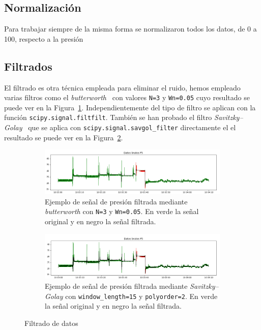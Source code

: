 \documentclass[a4paper,12pt,twoside,oldfontcommands]{memoir}
\begin{document}
\subsection{Normalización}
Para trabajar siempre de la misma forma se normalizaron todos los datos, de 0 a 100, respecto a la presión
\subsection{Filtrados}
El filtrado es otra técnica empleada para eliminar el ruido, hemos empleado varias filtros como el \textit{butterworth}~\cite{wiki:butter} con valores \texttt{N=3} y \texttt{Wn=0.05} cuyo resultado se puede ver en la Figura~\ref{fig:senalP5butter}. Independientemente del tipo de filtro se aplican con la función \texttt{scipy.signal.filtfilt}. También se han probado el filtro \textit{Savitzky–Golay}~\cite{wiki:savgol} que se aplica con \texttt{scipy.signal.savgol\_filter} directamente el el resultado se puede ver en la Figura~\ref{fig:senalP5savgol}.
\begin{figure}
    \centering
    \begin{subfigure}[b]{\textwidth}
        \includegraphics[width=1\textwidth]{images/SenalP5butter.png}
        \caption{Ejemplo de señal de presión filtrada mediante \textit{butterworth} con \texttt{N=3} y \texttt{Wn=0.05}. En verde la señal original y en negro la señal filtrada.}
        \label{fig:senalP5butter}
    \end{subfigure}
    \begin{subfigure}[b]{\textwidth}
        \includegraphics[width=1\textwidth]{images/SenalP5savgol.png}
        \caption{Ejemplo de señal de presión filtrada mediante \textit{Savitzky–Golay} con \texttt{window\_length=15} y \texttt{polyorder=2}. En verde la señal original y en negro la señal filtrada.}
        \label{fig:senalP5savgol}
    \end{subfigure}
    \caption{Filtrado de datos}
    \label{fig:filters}
\end{figure}
\end{document}

